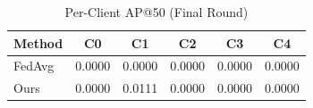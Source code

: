 \begin{table}[t]
  \centering
  \caption{Per-Client AP@50 (Final Round)}
  \label{tab:per_client}
  \begin{tabular}{lccccc}
    \toprule
    Method & C0 & C1 & C2 & C3 & C4 \\
    \midrule
    FedAvg & 0.0000 & 0.0000 & 0.0000 & 0.0000 & 0.0000 \\
    Ours & 0.0000 & 0.0111 & 0.0000 & 0.0000 & 0.0000 \\
    \bottomrule
  \end{tabular}
\end{table}